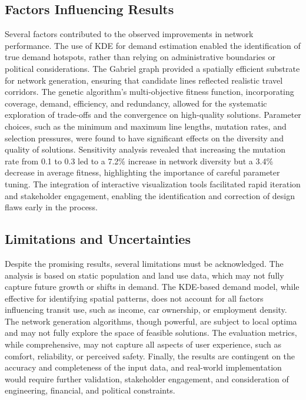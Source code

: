 \documentclass[manuscript,screen,review]{acmart}
\begin{document}
\subsection{Factors Influencing Results}
Several factors contributed to the observed improvements in network performance. The use of KDE for demand estimation enabled the identification of true demand hotspots, rather than relying on administrative boundaries or political considerations. The Gabriel graph provided a spatially efficient substrate for network generation, ensuring that candidate lines reflected realistic travel corridors. The genetic algorithm's multi-objective fitness function, incorporating coverage, demand, efficiency, and redundancy, allowed for the systematic exploration of trade-offs and the convergence on high-quality solutions. Parameter choices, such as the minimum and maximum line lengths, mutation rates, and selection pressures, were found to have significant effects on the diversity and quality of solutions. Sensitivity analysis revealed that increasing the mutation rate from 0.1 to 0.3 led to a 7.2\% increase in network diversity but a 3.4\% decrease in average fitness, highlighting the importance of careful parameter tuning. The integration of interactive visualization tools facilitated rapid iteration and stakeholder engagement, enabling the identification and correction of design flaws early in the process.

\subsection{Limitations and Uncertainties}
Despite the promising results, several limitations must be acknowledged. The analysis is based on static population and land use data, which may not fully capture future growth or shifts in demand. The KDE-based demand model, while effective for identifying spatial patterns, does not account for all factors influencing transit use, such as income, car ownership, or employment density. The network generation algorithms, though powerful, are subject to local optima and may not fully explore the space of feasible solutions. The evaluation metrics, while comprehensive, may not capture all aspects of user experience, such as comfort, reliability, or perceived safety. Finally, the results are contingent on the accuracy and completeness of the input data, and real-world implementation would require further validation, stakeholder engagement, and consideration of engineering, financial, and political constraints.
\end{document}
